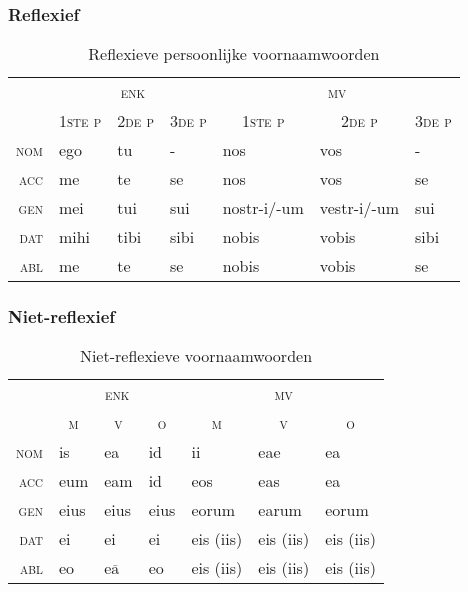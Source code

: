 \documentclass[12pt,a4paper]{article}
\begin{document}
\subsubsection{Reflexief}

\begin{table}[H]
\centering
\begin{tabular}{ r | l l l | l l l }
\toprule
 & \multicolumn{3}{c|}{\textsc{enk}} & \multicolumn{3}{c}{\textsc{mv}} \\
 & \multicolumn{1}{c}{\textsc{1ste p}} & \multicolumn{1}{c}{\textsc{2de p}} & \multicolumn{1}{c|}{\textsc{3de p}} & \multicolumn{1}{c}{\textsc{1ste p}} & \multicolumn{1}{c}{\textsc{2de p}} & \multicolumn{1}{c}{\textsc{3de p}} \\ 
\midrule
\textsc{nom} & ego  & tu   & -    & nos         & vos          & - \\
\textsc{acc} & me   & te   & se   & nos         & vos          & se \\
\textsc{gen} & mei  & tui  & sui  & nostr-i/-um & vestr-i/-um  & sui \\
\textsc{dat} & mihi & tibi & sibi & nobis       & vobis        & sibi \\
\textsc{abl} & me   & te   & se   & nobis       & vobis        & se \\
\bottomrule
\end{tabular}
\caption{Reflexieve persoonlijke voornaamwoorden}
\label{tab:reflvnw}
\end{table}

\subsubsection{Niet-reflexief}

\begin{table}[H]
\centering
\begin{tabular}{ r | l l l | l l l }
\toprule
 & \multicolumn{3}{c|}{\textsc{enk}} & \multicolumn{3}{c}{\textsc{mv}} \\
 & \multicolumn{1}{c}{\textsc{m}} & \multicolumn{1}{c}{\textsc{v}} & \multicolumn{1}{c|}{\textsc{o}} & \multicolumn{1}{c}{\textsc{m}} & \multicolumn{1}{c}{\textsc{v}} & \multicolumn{1}{c}{\textsc{o}} \\ 
\midrule
\textsc{nom} & is  & ea                     & id & ii    & eae       & ea \\
\textsc{acc} & eum & eam                    & id & eos   & eas       & ea \\
\textsc{gen} & eius   & eius                   & eius  & eorum & earum     & eorum \\
\textsc{dat} & ei   & ei                     & ei  & eis (iis)     & eis (iis) & eis (iis) \\
\textsc{abl} & eo  & e$\overline{\text{a}}$ & eo & eis (iis)     & eis (iis) & eis (iis) \\
\bottomrule
\end{tabular}
\caption{Niet-reflexieve voornaamwoorden}
\label{tab:ntreflvnw}
\end{table}
\end{document}
